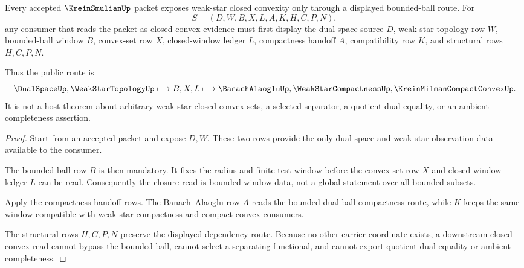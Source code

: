\begin{theorem}
\label{thm:krein-smulian-weak-star-ball-route}
Every accepted $\KreinSmulianUp$ packet exposes weak-star closed convexity only through a displayed bounded-ball route. For
$$
S=(D,W,B,X,L,A,K,H,C,P,N),
$$
any consumer that reads the packet as closed-convex evidence must first display the dual-space source $D$, weak-star topology row $W$, bounded-ball window $B$, convex-set row $X$, closed-window ledger $L$, compactness handoff $A$, compatibility row $K$, and structural rows $H,C,P,N$.

Thus the public route is
$$
\DualSpaceUp,\WeakStarTopologyUp \longmapsto B,X,L \longmapsto \BanachAlaogluUp,\WeakStarCompactnessUp,\KreinMilmanCompactConvexUp .
$$
It is not a host theorem about arbitrary weak-star closed convex sets, a selected separator, a quotient-dual equality, or an ambient completeness assertion.
\end{theorem}
\begin{proof}
Start from an accepted packet and expose $D,W$. These two rows provide the only dual-space and weak-star observation data available to the consumer.

The bounded-ball row $B$ is then mandatory. It fixes the radius and finite test window before the convex-set row $X$ and closed-window ledger $L$ can be read. Consequently the closure read is bounded-window data, not a global statement over all bounded subsets.

Apply the compactness handoff rows. The Banach--Alaoglu row $A$ reads the bounded dual-ball compactness route, while $K$ keeps the same window compatible with weak-star compactness and compact-convex consumers.

The structural rows $H,C,P,N$ preserve the displayed dependency route. Because no other carrier coordinate exists, a downstream closed-convex read cannot bypass the bounded ball, cannot select a separating functional, and cannot export quotient dual equality or ambient completeness.
\end{proof}


